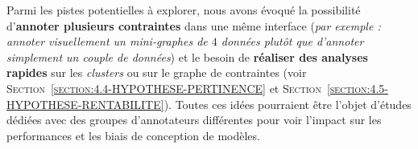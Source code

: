 	Parmi les pistes potentielles à explorer, nous avons évoqué la possibilité d'\textbf{annoter plusieurs contraintes} dans une même interface (\textit{par exemple : annoter visuellement un mini-graphes de $4$ données plutôt que d'annoter simplement un couple de données}) et le besoin de \textbf{réaliser des analyses rapides} sur les \textit{clusters} ou sur le graphe de contraintes (voir \textsc{Section~\ref{section:4.4-HYPOTHESE-PERTINENCE}} et \textsc{Section~\ref{section:4.5-HYPOTHESE-RENTABILITE}}).
	Toutes ces idées pourraient être l'objet d'études dédiées avec des groupes d'annotateurs différentes pour voir l'impact sur les performances et les biais de conception de modèles.
